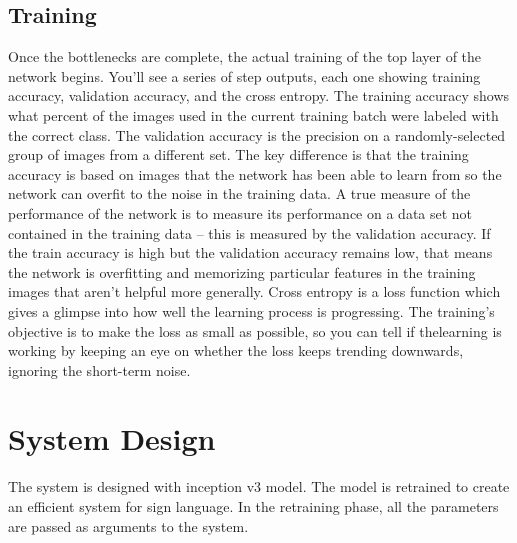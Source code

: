 \subsection{Training} Once the bottlenecks are complete, the actual training of the top layer of
the network begins. You'll see a series of step outputs, each one showing
training accuracy, validation accuracy, and the cross entropy. The training
accuracy shows what percent of the images used in the current training
batch were labeled with the correct class. The validation accuracy is the
precision on a randomly-selected group of images from a different set. The
key difference is that the training accuracy is based on images that the
network has been able to learn from so the network can overfit to the noise
in the training data. A true measure of the performance of the network is to
measure its performance on a data set not contained in the training data --
this is measured by the validation accuracy. If the train accuracy is high
but the validation accuracy remains low, that means the network is
overfitting and memorizing particular features in the training images that
aren't helpful more generally. Cross entropy is a loss function which gives
a glimpse into how well the learning process is progressing. The training's
objective is to make the loss as small as possible, so you can tell if thelearning is working by keeping an eye on whether the loss keeps trending
downwards, ignoring the short-term noise.

\section{System Design}
\par
The system is designed with inception v3 model. The model is retrained to create an efficient system for sign language. In the retraining phase, all the parameters are passed as arguments to the system.


